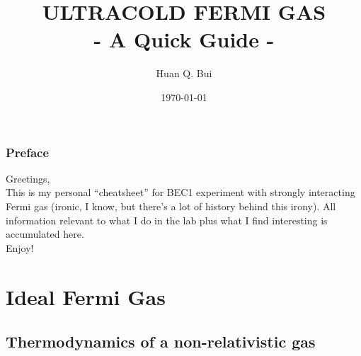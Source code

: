 \documentclass{book}
\theoremstyle{definition}
\begin{document}
	\begin{titlepage}\centering
		\clearpage
		\title{{\textsc{\textbf{ULTRACOLD FERMI GAS}}}\\ \smallskip - A Quick Guide - \\}
		\author{\bigskip Huan Q. Bui}
		\date{\today}
		\maketitle
		\thispagestyle{empty}
	\end{titlepage}




\subsection*{Preface}

Greetings, \\

This is my personal ``cheatsheet'' for BEC1 experiment with strongly interacting Fermi gas (ironic, I know, but there's a lot of history behind this irony). All information relevant to what I do in the lab plus what I find interesting is accumulated here. \\

\noindent Enjoy!

\newpage
\tableofcontents
\newpage








\chapter{Ideal Fermi Gas}


\section{Thermodynamics of a non-relativistic gas}
\end{document}
